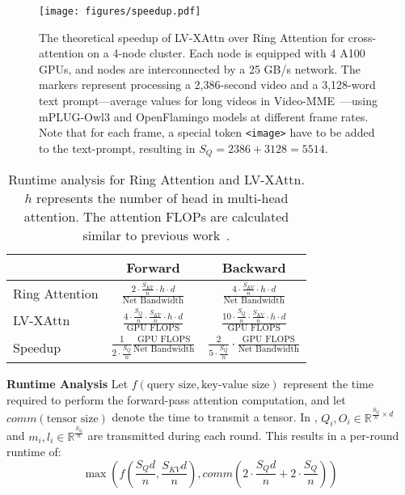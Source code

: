 \begin{figure}[t]
    \centering
    \texttt{[image: figures/speedup.pdf]}
    \caption{The theoretical speedup of LV-XAttn over Ring Attention for cross-attention on a 4-node cluster. Each node is equipped with 4 A100 GPUs, and nodes are interconnected by a 25 GB/s network. The markers represent processing a 2,386-second video and a 3,128-word text prompt—average values for long videos in Video-MME~\cite{fu2024video-mme}—using mPLUG-Owl3 and OpenFlamingo models at different frame rates. Note that for each frame, a special token \texttt{<image>} have to be added to the text-prompt, resulting in $S_Q = 2386+3128=5514$.}
    \label{fig:speedup}
\end{figure}
\begin{table}[tbp]
    \centering
    \caption{Runtime analysis for Ring Attention and LV-XAttn. $h$ represents the number of head in multi-head attention. The attention FLOPs are calculated similar to previous work~\cite{dao2023fa2}. }
    \begin{tabular}{l|c|c}
        \hline
         & Forward & Backward \\ \hline 
        Ring Attention & $\frac{2\cdot\frac{S_{KV}}{n}\cdot h\cdot d}{\text{Net Bandwidth}}$ & $\frac{4\cdot\frac{S_{KV}}{n}\cdot h\cdot d}{\text{Net Bandwidth}}$ \\[7pt]
        LV-XAttn & $\frac{4\cdot\frac{S_Q}{n}\cdot\frac{S_{KV}}{n}\cdot h\cdot d}{\text{GPU FLOPS}}$ & $\frac{10\cdot\frac{S_Q}{n}\cdot\frac{S_{KV}}{n}\cdot h\cdot d}{\text{GPU FLOPS}}$ \\[7pt]
        Speedup & $\frac{1}{2\cdot\frac{S_Q}{n}}\frac{\text{GPU FLOPS}}{\text{Net Bandwidth}}$ & $\frac{2}{5\cdot\frac{S_Q}{n}}\cdot\frac{\text{GPU FLOPS}}{\text{Net Bandwidth}}$ \\ [7pt]\hline
    \end{tabular}
    \label{tab:runtime-formula}
    \vspace{-2ex}
\end{table}
\textbf{Runtime Analysis} Let $f(\text{query size}, \text{key-value 
size})$ represent the time required to perform the forward-pass attention computation, and let $comm(\text{tensor size})$ denote the time to transmit a tensor. In , $Q_i, O_i\in \mathbb{R}^{\frac{S_Q}{n} \times d}$ and $m_i, l_i \in \mathbb{R}^{\frac{S_Q}{n}}$ are transmitted during each round. This results in a per-round runtime of:
\begin{equation} \label{eqn:lv-xattn}
    \max\left(f(\frac{S_Qd}{n}, \frac{S_{KV}d}{n}), comm(2\cdot\frac{S_Qd}{n} + 2\cdot\frac{S_Q}{n})\right)
\end{equation}

